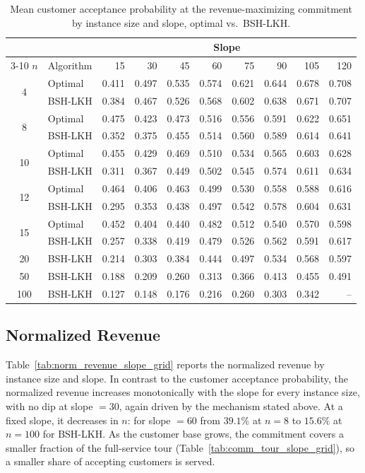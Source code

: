 \documentclass[11pt]{article}
\theoremstyle{plain}
\theoremstyle{definition}
\begin{document}
\begin{table}[t]
\centering
\small
\begin{tabular}{c l rrrrrrrr}
	\toprule
	& & \multicolumn{8}{c}{Slope} \\
	\cmidrule(lr){3-10}
	$n$ & Algorithm & 15 & 30 & 45 & 60 & 75 & 90 & 105 & 120 \\
	\midrule
	\multirow{2}{*}{4} & Optimal & 0.411 & 0.497 & 0.535 & 0.574 & 0.621 & 0.644 & 0.678 & 0.708 \\
	& BSH-LKH & 0.384 & 0.467 & 0.526 & 0.568 & 0.602 & 0.638 & 0.671 & 0.707 \\
	\midrule
	\multirow{2}{*}{8} & Optimal & 0.475 & 0.423 & 0.473 & 0.516 & 0.556 & 0.591 & 0.622 & 0.651 \\
	& BSH-LKH & 0.352 & 0.375 & 0.455 & 0.514 & 0.560 & 0.589 & 0.614 & 0.641 \\
	\midrule
	\multirow{2}{*}{10} & Optimal & 0.455 & 0.429 & 0.469 & 0.510 & 0.534 & 0.565 & 0.603 & 0.628 \\
	& BSH-LKH & 0.311 & 0.367 & 0.449 & 0.502 & 0.545 & 0.574 & 0.611 & 0.634 \\
	\midrule
	\multirow{2}{*}{12} & Optimal & 0.464 & 0.406 & 0.463 & 0.499 & 0.530 & 0.558 & 0.588 & 0.616 \\
	& BSH-LKH & 0.295 & 0.353 & 0.438 & 0.497 & 0.542 & 0.578 & 0.604 & 0.631 \\
	\midrule
	\multirow{2}{*}{15} & Optimal & 0.452 & 0.404 & 0.440 & 0.482 & 0.512 & 0.540 & 0.570 & 0.598 \\
	& BSH-LKH & 0.257 & 0.338 & 0.419 & 0.479 & 0.526 & 0.562 & 0.591 & 0.617 \\
	\midrule
	\multirow{1}{*}{20} & BSH-LKH & 0.214 & 0.303 & 0.384 & 0.444 & 0.497 & 0.534 & 0.568 & 0.597 \\
	\midrule
	\multirow{1}{*}{50} & BSH-LKH & 0.188 & 0.209 & 0.260 & 0.313 & 0.366 & 0.413 & 0.455 & 0.491 \\
	\midrule
	\multirow{1}{*}{100} & BSH-LKH & 0.127 & 0.148 & 0.176 & 0.216 & 0.260 & 0.303 & 0.342 & -- \\
	\bottomrule
\end{tabular}
\caption{Mean customer acceptance probability at the revenue-maximizing commitment by instance size and slope, optimal vs.\ BSH-\ac{LKH}.}
\label{tab:cust_acc_slope_grid}
\end{table}

\subsection{Normalized Revenue}
Table~\ref{tab:norm_revenue_slope_grid} reports the normalized revenue by
instance size and slope. In contrast to
the customer acceptance probability, the normalized revenue increases
monotonically with the slope for every instance size, with no dip at slope $= 30$, again
driven by the mechanism stated above. At a fixed slope, it decreases in $n$: for
slope $= 60$ from $39.1\%$ at $n = 8$ to $15.6\%$ at $n = 100$ for BSH-\ac{LKH}. As the
customer base grows, the commitment covers a smaller fraction of the full-service tour
(Table~\ref{tab:comm_tour_slope_grid}), so a smaller share of accepting customers is
served.
\end{document}
